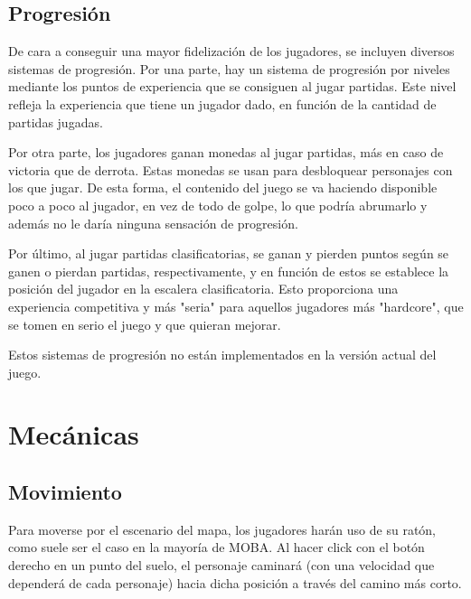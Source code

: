 \subsection{Progresión}
De cara a conseguir una mayor fidelización de los jugadores, se incluyen diversos sistemas de progresión. Por una parte, hay un sistema de progresión por niveles mediante los puntos de experiencia que se consiguen al jugar partidas. Este nivel refleja la experiencia que tiene un jugador dado, en función de la cantidad de partidas jugadas.

Por otra parte, los jugadores ganan monedas al jugar partidas, más en caso de victoria que de derrota. Estas monedas se usan para desbloquear personajes con los que jugar. De esta forma, el contenido del juego se va haciendo disponible poco a poco al jugador, en vez de todo de golpe, lo que podría abrumarlo y además no le daría ninguna sensación de progresión.

Por último, al jugar partidas clasificatorias, se ganan y pierden puntos según se ganen o pierdan partidas, respectivamente, y en función de estos se establece la posición del jugador en la escalera clasificatoria. Esto proporciona una experiencia competitiva y más "seria" para aquellos jugadores más "hardcore", que se tomen en serio el juego y que quieran mejorar.

\vspace{\baselineskip}

Estos sistemas de progresión no están implementados en la versión actual del juego.


\section{Mecánicas}
\subsection{Movimiento}
Para moverse por el escenario del mapa, los jugadores harán uso de su ratón, como suele ser el caso en la mayoría de MOBA. Al hacer click con el botón derecho en un punto del suelo, el personaje caminará (con una velocidad que dependerá de cada personaje) hacia dicha posición a través del camino más corto.

